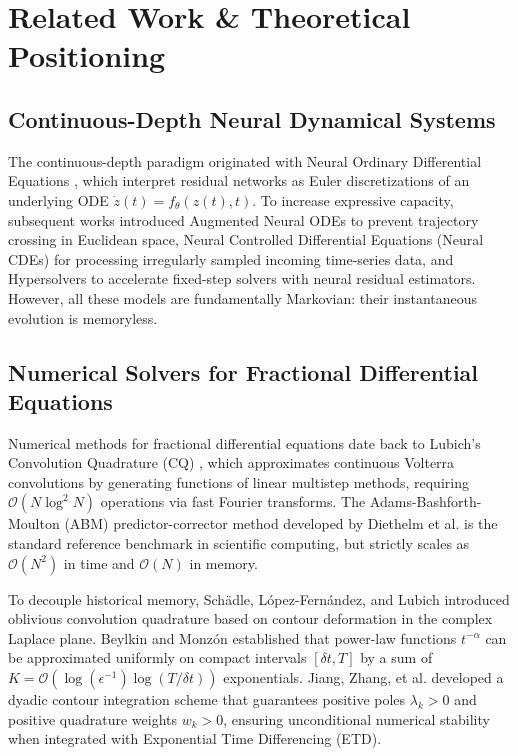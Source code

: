 \documentclass[11pt,a4paper]{article}
\theoremstyle{plain}
\theoremstyle{definition}
\begin{document}
\section{Related Work \& Theoretical Positioning}
\label{sec:related_work}

\subsection{Continuous-Depth Neural Dynamical Systems}
The continuous-depth paradigm originated with Neural Ordinary Differential Equations \cite{chen2018neural}, which interpret residual networks as Euler discretizations of an underlying ODE $\dot{z}(t) = f_\theta(z(t), t)$. To increase expressive capacity, subsequent works introduced Augmented Neural ODEs \cite{dupont2019augmented} to prevent trajectory crossing in Euclidean space, Neural Controlled Differential Equations (Neural CDEs) \cite{kidger2020neural} for processing irregularly sampled incoming time-series data, and Hypersolvers \cite{poli2020hypersolvers} to accelerate fixed-step solvers with neural residual estimators. However, all these models are fundamentally Markovian: their instantaneous evolution is memoryless.

\subsection{Numerical Solvers for Fractional Differential Equations}
Numerical methods for fractional differential equations date back to Lubich's Convolution Quadrature (CQ) \cite{lubich1986discretized,lubich2004convolution}, which approximates continuous Volterra convolutions by generating functions of linear multistep methods, requiring $\mathcal{O}(N \log^2 N)$ operations via fast Fourier transforms. The Adams-Bashforth-Moulton (ABM) predictor-corrector method developed by Diethelm et al. \cite{diethelm2002predictor,diethelm2010analysis} is the standard reference benchmark in scientific computing, but strictly scales as $\mathcal{O}(N^2)$ in time and $\mathcal{O}(N)$ in memory.

To decouple historical memory, Sch{\"a}dle, L{\'o}pez-Fern{\'a}ndez, and Lubich \cite{schadle2006fast,lopez2006contour} introduced oblivious convolution quadrature based on contour deformation in the complex Laplace plane. Beylkin and Monz{\'o}n \cite{beylkin2005approximation} established that power-law functions $t^{-\alpha}$ can be approximated uniformly on compact intervals $[\delta t, T]$ by a sum of $K = \mathcal{O}(\log(\epsilon^{-1}) \log(T/\delta t))$ exponentials. Jiang, Zhang, et al. \cite{jiang2017fast} developed a dyadic contour integration scheme that guarantees positive poles $\lambda_k > 0$ and positive quadrature weights $w_k > 0$, ensuring unconditional numerical stability when integrated with Exponential Time Differencing (ETD). 
\end{document}
